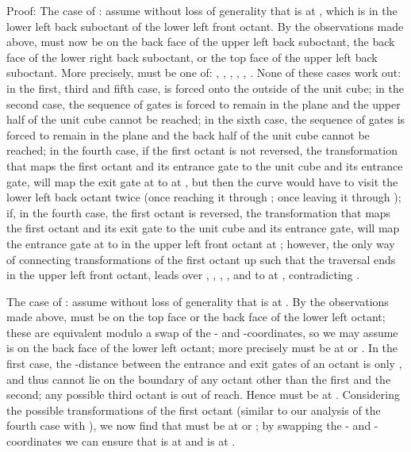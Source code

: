 \documentclass[11pt,a4paper]{article}
\newenvironment{proof}{Proof:}{\qed}
\def\squareforqed{\hbox{\rlap{}}}
\def\qed{\ifmmode\squareforqed\else{\unskip\nobreak\hfil
\penalty50\hskip1em\null\nobreak\hfil\squareforqed
\parfillskip=0pt\finalhyphendemerits=0\endgraf}\fi}
\begin{document}
\begin{proof}
The case of : assume without loss of generality that  is at , which is in the lower left back suboctant of the lower left front octant. By the observations made above,  must now be on the back face of the upper left back suboctant, the back face of the lower right back suboctant, or the top face of the upper left back suboctant. More precisely,  must be one of: , , , , , . None of these cases work out: in the first, third and fifth case,  is forced onto the outside of the unit cube; in the second case, the sequence of gates  is forced to remain in the plane  and the upper half of the unit cube cannot be reached; in the sixth case, the sequence of gates  is forced to remain in the plane  and the back half of the unit cube cannot be reached; in the fourth case, if the first octant is not reversed, the transformation that maps the first octant and its entrance gate to the unit cube and its entrance gate, will map the exit gate  at  to  at , but then the curve would have to visit the lower left back octant twice (once reaching it through ; once leaving it through ); if, in the fourth case, the first octant is reversed, the transformation that maps the first octant and its exit gate to the unit cube and its entrance gate, will map the entrance gate  at  to  in the upper left front octant at ; however, the only way of connecting transformations of the first octant up such that the traversal ends in the upper left front octant, leads over , , , ,  and  to  at , contradicting .

The case of : assume without loss of generality that  is at . By the observations made above,  must be on the top face or the back face of the lower left octant; these are equivalent modulo a swap of the - and -coordinates, so we may assume  is on the back face of the lower left octant; more precisely  must be at  or . In the first case, the -distance between the entrance and exit gates of an octant is only , and thus  cannot lie on the boundary of any octant other than the first and the second; any possible third octant is out of reach. Hence  must be at . Considering the possible transformations of the first octant (similar to our analysis of the fourth case with ), we now find that  must be at  or ; by swapping the - and -coordinates we can ensure that  is at  and  is at .
\end{proof}
\end{document}
